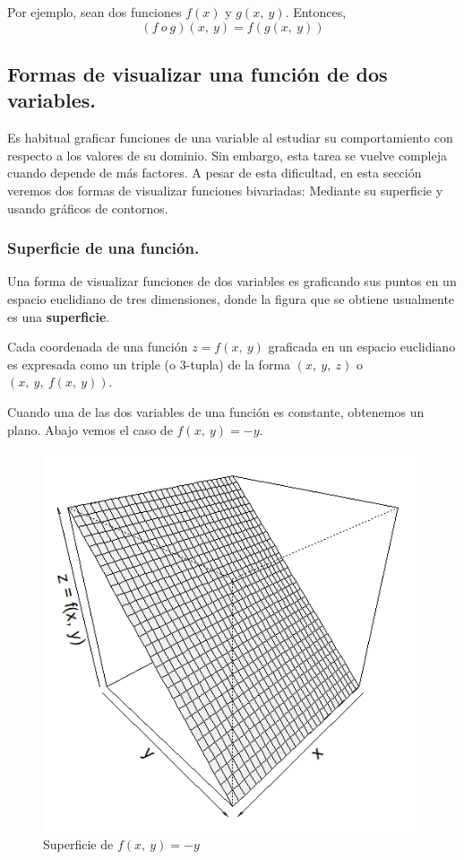\documentclass[12pt]{article}
\begin{document}
Por ejemplo, sean dos funciones $f(x)$ y $g(x, \ y)$. Entonces,
\[
  (f \ o \ g)(x, \ y) = f(g(x, \ y))
\]

\subsection{Formas de visualizar una función de dos variables.}

Es habitual graficar funciones de una variable al estudiar su comportamiento con respecto a los valores de su dominio. Sin embargo, esta tarea se vuelve compleja cuando depende de más factores. A pesar de esta dificultad, en esta sección veremos dos formas de visualizar funciones bivariadas: Mediante su superficie y usando gráficos de contornos.

\subsubsection{Superficie de una función.}

Una forma de visualizar funciones de dos variables es graficando sus puntos en un espacio euclidiano de tres dimensiones, donde la figura que se obtiene usualmente es una \textbf{superficie}.

Cada coordenada de una función $z = f(x, \ y)$ graficada en un espacio euclidiano es expresada como un triple (o $3$-tupla) de la forma $(x, \ y, \ z)$ o $(x, \ y, \ f(x, \ y))$.

Cuando una de las dos variables de una función es constante, obtenemos un plano. Abajo vemos el caso de $f(x, \ y) = -y$.

\begin{figure}[hbt!]
\centering
\includegraphics[scale = 0.35]{plano_var_cte.png}
\caption{Superficie de $f(x, \ y) = -y$}
\end{figure}
\end{document}
